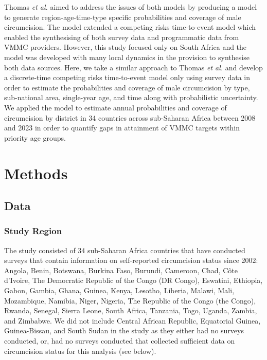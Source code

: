 \documentclass{article}
\begin{document}
Thomas {\it et al.} \cite{thomas2024substantial} aimed to address the issues of both models by producing a model to generate region-age-time-type specific probabilities and coverage of male circumcision. The model extended a competing risks time-to-event model which enabled the synthesising of both survey data and programmatic data from VMMC providers. However, this study focused only on South Africa and the model was developed with many local dynamics in the provision to synthesise both data sources. Here, we take a similar approach to Thomas {\it et al.} and develop a discrete-time competing risks time-to-event model only using survey data in order to estimate the probabilities and coverage of male circumcision by type, sub-national area, single-year age, and time along with probabilistic uncertainty. We applied the model to estimate annual probabilities and coverage of circumcision by district in 34 countries across sub-Saharan Africa between 2008 and 2023 in order to quantify gaps in attainment of VMMC targets within priority age groups. 


\section*{Methods}


\subsection*{Data}


\subsubsection*{Study Region}


The study consisted of 34 sub-Saharan Africa countries that have conducted surveys that contain information on self-reported circumcision status since 2002: Angola, Benin, Botswana, Burkina Faso, Burundi, Cameroon, Chad, Côte d’Ivoire, The Democratic Republic of the Congo (DR Congo), Eswatini, Ethiopia, Gabon, Gambia, Ghana, Guinea, Kenya, Lesotho, Liberia, Malawi, Mali, Mozambique, Namibia, Niger, Nigeria, The Republic of the Congo (the Congo), Rwanda, Senegal, Sierra Leone, South Africa, Tanzania, Togo, Uganda, Zambia, and Zimbabwe. We did not include Central African Republic, Equatorial Guinea, Guinea-Bissau, and South Sudan in the study as they either had no surveys conducted, or, had no surveys conducted that collected sufficient data on circumcision status for this analysis (see below). 
\end{document}
